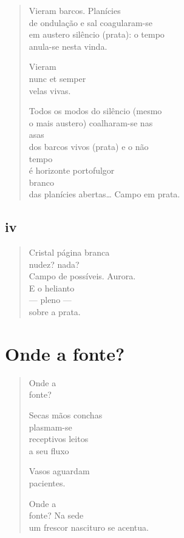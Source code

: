 \begin{verse}
Vieram barcos. Planícies\\
de ondulação e sal coagularam-se\\
em austero silêncio (prata): o tempo\\
anula-se nesta vinda.

Vieram\\
nunc et semper\\
velas vivas.

Todos os modos do silêncio (mesmo\\
o mais austero) \hfill coalharam-se nas\\
\hfill asas\\
dos barcos vivos (prata) \hfill e o não\\
\hfill tempo\\
é horizonte porto\hfill fulgor\\
\hfill branco\\
das planícies abertas\ldots{} Campo em prata.
\end{verse}

\medskip
\section{iv}

\begin{verse}
Cristal \hfill página branca\\
nudez? \hfill nada?\\
Campo de possíveis. Aurora.\\
E o helianto\\
\quad\quad\quad--- pleno ---\\
\hfill sobre a prata.
\end{verse}

\chapter{Onde a fonte?}

\begin{verse}
Onde a\\
\quad fonte?

\quad Secas mãos conchas\\
\quad plasmam-se\\
\quad receptivos leitos\\
\quad a seu fluxo

\quad Vasos aguardam\\
\quad\quad\quad pacientes.

Onde a\\
\quad fonte? Na sede\\
\quad um frescor nascituro
\quad\quad\quad se acentua.
\end{verse}

